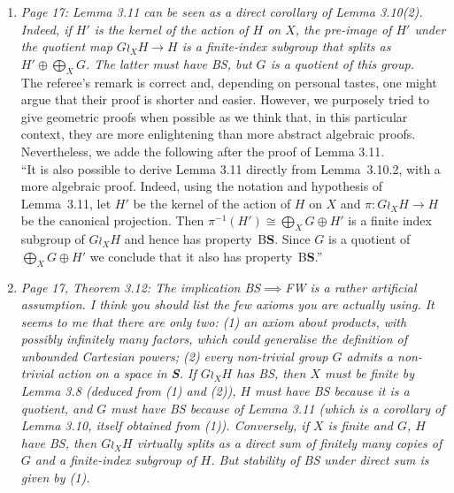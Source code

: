 \documentclass[english,a4paper]{article}
\newcommand*{\BS}{B\textbf{S}}
\begin{document}
\begin{enumerate}
The following discussion was added after the proof of Lemma 3.9:\\
``As a direct corollary, we obtain that if property BS implies property BS’ for some S’ with non-trivial group actions and seperating infinite Cartesian powers (example: BS’=FW), then the conclusion of Lemma 3.9 holds even if S might not satisfy it’s premises. At contrario, it follows from Theorem 1.2 and Proposition B that Lemma 3.9 do not holds for property FR, property FA or having uncountable cofinality.''
%
\item\textit{Page 17: Lemma 3.11 can be seen as a direct corollary of Lemma 3.10(2). Indeed, if $H'$ is the kernel of the action of $H$ on $X$, the pre-image of $H'$ under the quotient map $G\wr_XH\to H$ is a finite-index subgroup that splits as $H'\oplus\bigoplus_XG$. The latter must have BS, but $G$ is a quotient of this group.}\\
The referee's remark is correct and, depending on personal tastes, one might argue that their proof is shorter and easier.
However, we purposely tried to give geometric proofs when possible as we think that, in this particular context, they are more enlightening than more abstract algebraic proofs.
Nevertheless, we adde the following after the proof of Lemma 3.11.\\
``It is also possible to derive Lemma 3.11 directly from Lemma~3.10.2, with a more algebraic proof.
Indeed, using the notation and hypothesis of Lemma~3.11, let $H'$ be the kernel of the action of $H$ on $X$ and $\pi\colon G\wr_XH\to H$ be the canonical projection. Then $\pi^{-1}(H')\cong \bigoplus_XG\oplus H'$ is a finite index subgroup of $G\wr_XH$ and hence has property~\BS.
Since $G$ is a quotient of $\bigoplus_XG\oplus H'$ we conclude that it also has property~\BS.''
%
\item\textit{Page 17, Theorem 3.12: The implication BS$\implies$FW is a rather artificial assumption. I think you should list the few axioms you are actually using. It seems to me that there are only two: (1) an axiom about products, with possibly infinitely many factors, which could generalise the definition of unbounded Cartesian powers; (2) every non-trivial group $G$ admits a non-trivial action on a space in \textbf{S}.
If $G\wr_XH$ has BS, then $X$ must be finite by Lemma 3.8 (deduced from (1) and (2)), $H$ must have BS because it is a quotient, and $G$ must have BS because of Lemma 3.11 (which is a corollary of Lemma 3.10, itself obtained from (1)). Conversely, if $X$ is finite and $G$, $H$ have BS, then $G\wr_XH$ virtually splits as a direct sum of finitely many copies of $G$ and a finite-index subgroup of $H$. But stability of BS under direct sum is given by (1).}\\

\end{enumerate}
\end{document}
